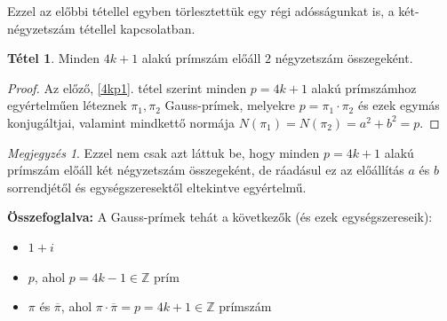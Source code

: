\documentclass[12pt]{book}
\theoremstyle{plain} %
\theoremstyle{definition} %
\newtheorem{theo/}{Tétel}[section]
\newenvironment{theo}
  {\renewcommand{\qedsymbol}{$\clubsuit$}%
   \pushQED{\qed}\begin{theo/}}
  {\popQED\end{theo/}}
\theoremstyle{remark}
\newtheorem*{mj}{Megjegyzés}
\renewcommand\qedsymbol{$\blacksquare$}
\numberwithin{equation}{section}  %
\def\Z{\mathbb{Z}}
\begin{document}
	Ezzel az előbbi tétellel egyben törlesztettük egy régi adósságunkat is, a két-négyzetszám tétellel kapcsolatban.
	
	\begin{theo}\label{torlesztes}
		Minden $4k+1$ alakú prímszám 
		előáll $2$ négyzetszám összegeként.
	\end{theo}

	\begin{proof}
		Az előző, \ref{4kp1}. tétel szerint minden $p=4k+1$ alakú prímszámhoz egyértelműen léteznek $\pi_1,\pi_2$ Gauss-prímek, melyekre $p=\pi_1\cdot \pi_2$ és ezek egymás konjugáltjai, valamint mindkettő normája $N(\pi_1)=N(\pi_2)=a^2+b^2=p$.
	\end{proof}

	\begin{mj}
		Ezzel nem csak azt láttuk be, hogy minden $p=4k+1$ alakú prímszám előáll két négyzetszám összegeként, de ráadásul ez az előállítás $a$ és $b$ sorrendjétől és egységszeresektől eltekintve egyértelmű. 
	\end{mj}

	\textbf{Összefoglalva: }A Gauss-prímek tehát a következők (és ezek egységszereseik):
	\begin{itemize}
		\item{$1+i$}
		\item{$p$, ahol $p=4k-1\in \Z$ prím}
		\item{$\pi$ és $\overline{\pi}$, ahol $\pi\cdot \overline{\pi}=p=4k+1\in \Z$ prímszám}
	\end{itemize}
	
\end{document}
